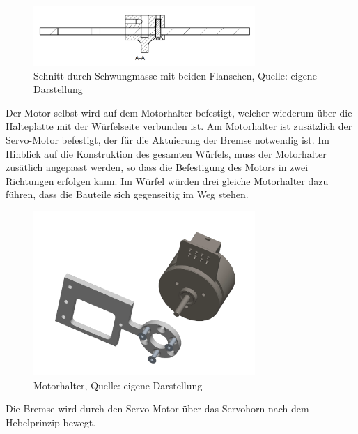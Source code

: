 	\begin{figure}[!h]
	\begin{center}
	\includegraphics[width=0.75\textwidth]{img/Schwungmasse_mit_Flanschen_Schnitt}
	\end{center}
	\caption{Schnitt durch Schwungmasse mit beiden Flanschen, Quelle: eigene Darstellung}
	\end{figure} 

Der Motor selbst wird auf dem Motorhalter befestigt, welcher wiederum über die Halteplatte mit der Würfelseite verbunden ist. Am Motorhalter ist zusätzlich der Servo-Motor befestigt, der für die Aktuierung der Bremse notwendig ist. 
Im Hinblick auf die Konstruktion des gesamten Würfels, muss der Motorhalter zusätlich angepasst werden, so dass die Befestigung des Motors in zwei Richtungen erfolgen kann. Im Würfel würden drei gleiche Motorhalter dazu führen, dass die Bauteile sich gegenseitig im Weg stehen. 

	\begin{figure}[h!]
	\begin{center}
	\includegraphics[width=0.75\textwidth]{img/Explosionszeichnung_Motor_Motorhalter.png}
	\end{center}
	\caption{Motorhalter, Quelle: eigene Darstellung}
	\end{figure} 

Die Bremse wird durch den Servo-Motor über das Servohorn nach dem Hebelprinzip bewegt. 


